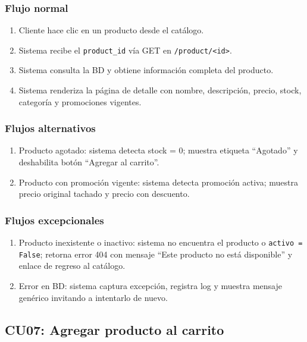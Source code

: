 \documentclass[12pt,a4paper]{article}
\begin{document}
\subsubsection*{Flujo normal}
\begin{enumerate}[label=FN-\arabic*]
    \item Cliente hace clic en un producto desde el catálogo.
    \item Sistema recibe el \texttt{product\_id} vía GET en \texttt{/product/<id>}.
    \item Sistema consulta la BD y obtiene información completa del producto.
    \item Sistema renderiza la página de detalle con nombre, descripción, precio, stock, categoría y promociones vigentes.
\end{enumerate}

\subsubsection*{Flujos alternativos}
\begin{enumerate}[label=FA-\arabic*]
    \item Producto agotado: sistema detecta stock = 0; muestra etiqueta “Agotado” y deshabilita botón “Agregar al carrito”.
    \item Producto con promoción vigente: sistema detecta promoción activa; muestra precio original tachado y precio con descuento.
\end{enumerate}

\subsubsection*{Flujos excepcionales}
\begin{enumerate}[label=FE-\arabic*]
    \item Producto inexistente o inactivo: sistema no encuentra el producto o \texttt{activo = False}; retorna error 404 con mensaje “Este producto no está disponible” y enlace de regreso al catálogo.
    \item Error en BD: sistema captura excepción, registra log y muestra mensaje genérico invitando a intentarlo de nuevo.
\end{enumerate}


\subsection{CU07: Agregar producto al carrito}
\end{document}
